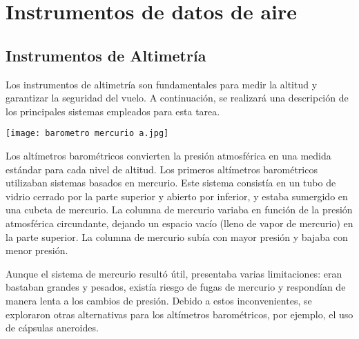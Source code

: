 
\chapter{Instrumentos de datos de aire}
\chapterspaceabove{6.75cm} %
\chapterspacebelow{7.25cm} %

\section{Instrumentos de Altimetría}
Los instrumentos de altimetría son fundamentales para medir la altitud y garantizar la seguridad del vuelo. A continuación, se realizará una descripción de los principales sistemas empleados para esta tarea.\\

\begin{minipage}{0.3\textwidth} %
    \centering
    \texttt{[image: barometro mercurio a.jpg]}
\end{minipage}
\hspace{1cm}
\begin{minipage}{0.57\textwidth} %
    Los altímetros barométricos convierten la presión atmosférica en una medida estándar para cada nivel de altitud. Los primeros altímetros barométricos utilizaban sistemas basados en mercurio. Este sistema consistía en un tubo de vidrio cerrado por la parte superior y abierto por inferior, y estaba sumergido en una cubeta de mercurio. La columna de mercurio variaba en función de la presión atmosférica circundante, dejando un espacio vacío (lleno de vapor de mercurio) en la parte superior. La columna de mercurio subía con mayor presión y bajaba con menor presión.
\end{minipage}

\vspace{0.5cm}


Aunque el sistema de mercurio resultó útil, presentaba varias limitaciones: eran bastaban grandes y pesados, existía riesgo de fugas de mercurio y respondían de manera lenta a los cambios de presión. Debido a estos inconvenientes, se exploraron otras alternativas para los altímetros barométricos, por ejemplo, el uso de cápsulas aneroides.\\

